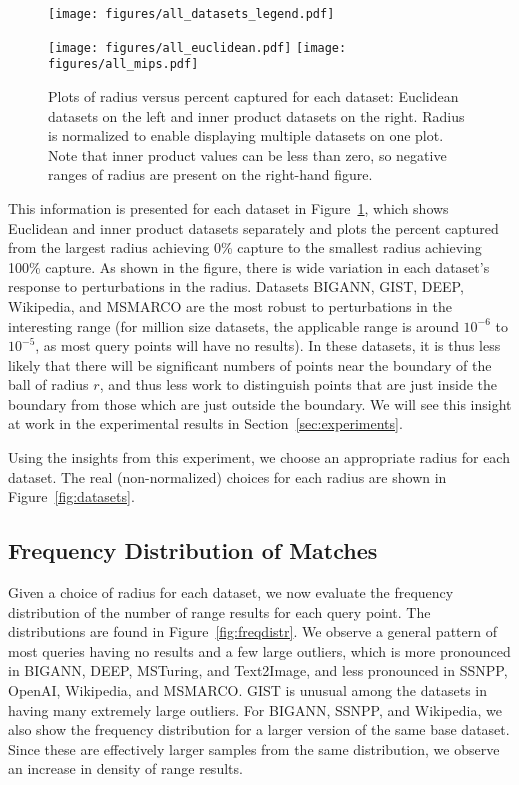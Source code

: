 \begin{figure}
	\centering
	\texttt{[image: figures/all\_datasets\_legend.pdf]}

		\texttt{[image: figures/all\_euclidean.pdf]}
		\texttt{[image: figures/all\_mips.pdf]}

	\caption{Plots of radius versus percent captured for each dataset: Euclidean datasets on the left and inner product datasets on the right. Radius is normalized to enable displaying multiple datasets on one plot. Note that inner product values can be less than zero, so negative ranges of radius are present on the right-hand figure.}
	\label{fig:pctcaptured}
\end{figure}

This information is presented for each dataset in Figure~\ref{fig:pctcaptured}, which shows Euclidean and inner product datasets separately and plots the percent captured from the largest radius achieving 0\% capture to the smallest radius achieving 100\% capture. As shown in the figure, there is wide variation in each dataset's response to perturbations in the radius. Datasets BIGANN, GIST, DEEP, Wikipedia, and MSMARCO are the most robust to perturbations in the interesting range (for million size datasets, the applicable range is around $10^{-6}$ to $10^{-5}$, as most query points will have no results). In these datasets, it is thus less likely that there will be significant numbers of points near the boundary of the ball of radius $r$, and thus less work to distinguish points that are just inside the boundary from those which are just outside the boundary. We will see this insight at work in the experimental results in Section~\ref{sec:experiments}.

Using the insights from this experiment, we choose an appropriate radius for each dataset. The real (non-normalized) choices for each radius are shown in Figure~\ref{fig:datasets}.

\subsection{Frequency Distribution of Matches}

Given a choice of radius for each dataset, we now evaluate the frequency distribution of the number of range results for each query point. The distributions are found in Figure~\ref{fig:freqdistr}. We observe a general pattern of most queries having no results and a few large outliers, which is more pronounced in BIGANN, DEEP, MSTuring, and Text2Image, and less pronounced in SSNPP, OpenAI, Wikipedia, and MSMARCO. GIST is unusual among the datasets in having many extremely large outliers. For BIGANN, SSNPP, and Wikipedia, we also show the frequency distribution for a larger version of the same base dataset. Since these are effectively larger samples from the same distribution, we observe an increase in density of range results. 

